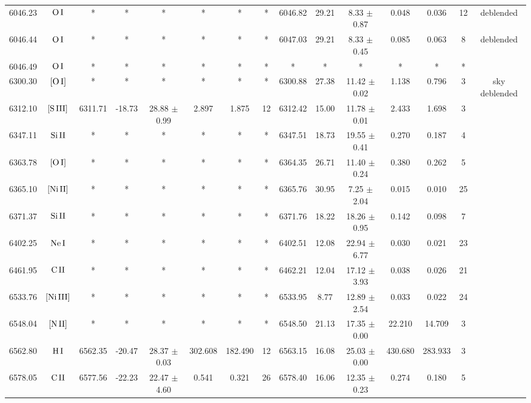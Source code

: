 \documentclass{article}
\begin{document}
\begin{table*}
\begin{adjustbox}{width=\textwidth}
\begin{tabular}{ccccccccccccccc}
6046.23 & $\mbox{O}\thinspace \mbox{I}$ & * & * & * & * & * & * & 6046.82 & 29.21 & 8.33 $\pm$ 0.87 & 0.048 & 0.036 & 12 &  deblended \\
6046.44 & $\mbox{O}\thinspace \mbox{I}$ & * & * & * & * & * & * & 6047.03 & 29.21 & 8.33 $\pm$ 0.45 & 0.085 & 0.063 & 8 &  deblended \\
6046.49 & $\mbox{O}\thinspace \mbox{I}$ & * & * & * & * & * & * & * & * & * & * & * & * &  \\
6300.30 & $\mbox{[O}\thinspace \mbox{I]}$ & * & * & * & * & * & * & 6300.88 & 27.38 & 11.42 $\pm$ 0.02 & 1.138 & 0.796 & 3 &  sky deblended \\
6312.10 & $\mbox{[S}\thinspace \mbox{III]}$ & 6311.71 & -18.73 & 28.88 $\pm$ 0.99 & 2.897 & 1.875 & 12 & 6312.42 & 15.00 & 11.78 $\pm$ 0.01 & 2.433 & 1.698 & 3 &  \\
6347.11 & $\mbox{Si}\thinspace \mbox{II}$ & * & * & * & * & * & * & 6347.51 & 18.73 & 19.55 $\pm$ 0.41 & 0.270 & 0.187 & 4 &  \\
6363.78 & $\mbox{[O}\thinspace \mbox{I]}$ & * & * & * & * & * & * & 6364.35 & 26.71 & 11.40 $\pm$ 0.24 & 0.380 & 0.262 & 5 &  \\
6365.10 & $\mbox{[Ni}\thinspace \mbox{II]}$ & * & * & * & * & * & * & 6365.76 & 30.95 & 7.25 $\pm$ 2.04 & 0.015 & 0.010 & 25 &  \\
6371.37 & $\mbox{Si}\thinspace \mbox{II}$ & * & * & * & * & * & * & 6371.76 & 18.22 & 18.26 $\pm$ 0.95 & 0.142 & 0.098 & 7 &  \\
6402.25 & $\mbox{Ne}\thinspace \mbox{I}$ & * & * & * & * & * & * & 6402.51 & 12.08 & 22.94 $\pm$ 6.77 & 0.030 & 0.021 & 23 &  \\
6461.95 & $\mbox{C}\thinspace \mbox{II}$ & * & * & * & * & * & * & 6462.21 & 12.04 & 17.12 $\pm$ 3.93 & 0.038 & 0.026 & 21 &  \\
6533.76 & $\mbox{[Ni}\thinspace \mbox{III]}$ & * & * & * & * & * & * & 6533.95 & 8.77 & 12.89 $\pm$ 2.54 & 0.033 & 0.022 & 24 &  \\
6548.04 & $\mbox{[N}\thinspace \mbox{II]}$ & * & * & * & * & * & * & 6548.50 & 21.13 & 17.35 $\pm$ 0.00 & 22.210 & 14.709 & 3 &  \\
6562.80 & $\mbox{H}\thinspace \mbox{I}$ & 6562.35 & -20.47 & 28.37 $\pm$ 0.03 & 302.608 & 182.490 & 12 & 6563.15 & 16.08 & 25.03 $\pm$ 0.00 & 430.680 & 283.933 & 3 &  \\
6578.05 & $\mbox{C}\thinspace \mbox{II}$ & 6577.56 & -22.23 & 22.47 $\pm$ 4.60 & 0.541 & 0.321 & 26 & 6578.40 & 16.06 & 12.35 $\pm$ 0.23 & 0.274 & 0.180 & 5 &  \\

\end{tabular}
\end{adjustbox}
\end{table*}
\end{document}

